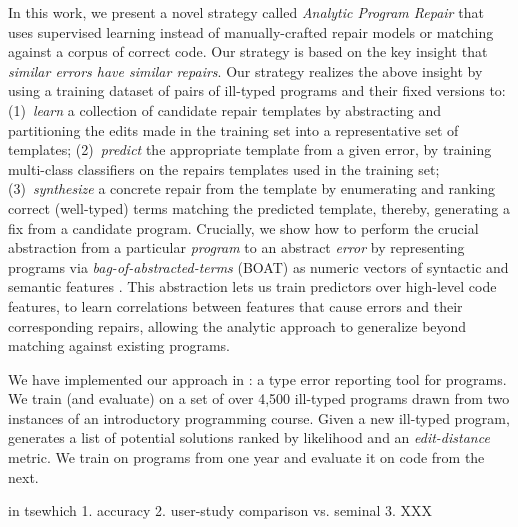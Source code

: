 %
In this work, we present a novel strategy called 
\emph{Analytic Program Repair} that uses supervised 
learning instead of manually-crafted repair models 
or matching against a corpus of correct code.
%
Our strategy is based on the key insight that 
\emph{similar errors have similar repairs}.
%
Our strategy realizes the above insight by using 
a training dataset of pairs of ill-typed programs 
and their fixed versions to: 
%
(1)~\emph{learn} a collection of candidate repair templates 
    by abstracting and partitioning the edits made in the 
    training set into a representative set of templates;
%
(2)~\emph{predict} the appropriate template from a given error, 
    by training multi-class classifiers on the repairs templates 
    used in the training set; 
%
(3)~\emph{synthesize} a concrete repair from the template 
   by enumerating and ranking correct (\eg well-typed) 
   terms matching the predicted template, 
%
thereby, generating a fix from a candidate program.
%
Crucially, we show how to perform the crucial abstraction 
from a particular \emph{program} to an abstract \emph{error} 
by representing programs via \emph{bag-of-abstracted-terms} (BOAT) 
\ie as numeric vectors of syntactic and semantic features \cite{Seidel2017-ko}. 
%
This abstraction lets us train predictors over high-level 
code features, \ie to learn correlations between features 
that cause errors and their corresponding repairs, allowing 
the analytic approach to generalize beyond matching against 
existing programs.

\mypara{\toolname}
%
We have implemented our approach in \toolname: a type error reporting 
tool for \ocaml programs. We train (and evaluate) \toolname on a set of 
over 4,500 ill-typed \ocaml programs drawn from two instances of an 
introductory programming course.
%
Given a new ill-typed program, \toolname generates a list of
potential solutions ranked by likelihood and an \emph{edit-distance}
metric. 
%
We train \toolname on programs from one year and evaluate it on code 
from the next.

in tsewhich 
    1. accuracy
    2. user-study comparison vs. seminal
    3. XXX


